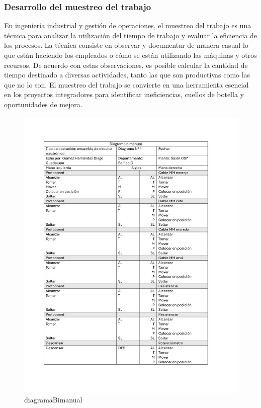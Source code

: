     \subsubsection{Desarrollo del muestreo del trabajo}
    En ingeniería industrial y gestión de operaciones, el muestreo del trabajo es una técnica para analizar la utilización del tiempo de trabajo y evaluar la eficiencia de los procesos. La técnica consiste en observar y documentar de manera casual lo que están haciendo los empleados o cómo se están utilizando las máquinas y otros recursos. De acuerdo con estas observaciones, es posible calcular la cantidad de tiempo destinado a diversas actividades, tanto las que son productivas como las que no lo son. El muestreo del trabajo se convierte en una herramienta esencial en los proyectos integradores para identificar ineficiencias, cuellos de botella y oportunidades de mejora.
    \begin{figure}[H]
        \centering
        \includegraphics[scale=0.4]{13/img/diagramaBimanual.pdf}
        \caption{diagramaBimanual}
        \label{fig:diagramaBimanual}
    \end{figure}
